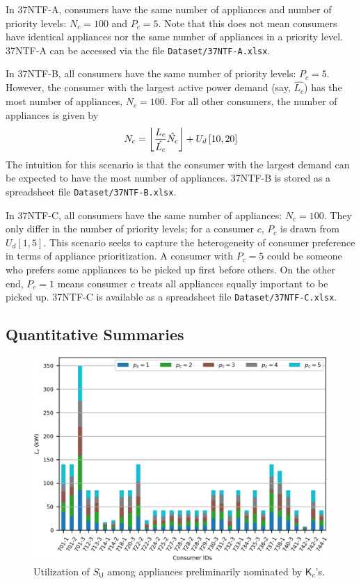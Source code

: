 \documentclass[journal, a4paper]{IEEEtran}
\DeclarePairedDelimiter\floor{\lfloor}{\rfloor}
\begin{document}
In 37NTF-A, consumers have the same number of appliances and number of priority levels:
$N_{c} = 100$ and $P_{c} = 5$.
Note that this does not mean consumers have identical appliances nor the same number of appliances in a priority level.
37NTF-A can be accessed via the file \texttt{Dataset/37NTF-A.xlsx}.

In 37NTF-B, all consumers have the same number of priority levels: $P_{c} = 5$.
However, the consumer with the largest active power demand (say, $\hat{L_{c}}$)
has the most number of appliances, $\hat{N_{c}} = 100$.
For all other consumers, the number of appliances is given by
\begin{equation*}
	N_{c} = \floor*{\frac{L_{c}}{\hat{L_{c}}} \hat{N_{c}}} + U_{d} \left[10,20\right]
\end{equation*}
The intuition for this scenario is that the consumer with the largest demand can be expected to have the most number of appliances.
37NTF-B is stored as a spreadsheet file \texttt{Dataset/37NTF-B.xlsx}.

In 37NTF-C, all consumers have the same number of appliances: $N_{c} = 100$.
They only differ in the number of priority levels;
for a consumer $c$, $P_{c}$ is drawn from $U_{d} \left[1,5\right]$.
This scenario seeks to capture the heterogeneity of consumer preference in terms of appliance prioritization.
A consumer with $P_{c} = 5$ could be someone who prefers some appliances to be picked up first before others.
On the other end, $P_{c} = 1$ means consumer $c$ treats all appliances equally important to be picked up.
37NTF-C is available as a spreadsheet file \texttt{Dataset/37NTF-C.xlsx}.


\subsection{Quantitative Summaries}
\label{subsec: III. Quantitative Summaries}

\begin{figure}[t!]
	\centering
	\includegraphics[scale=1.0]{37NTF-A TRPL}
	\caption{Utilization of $S_{\mathsf{U}}$ among appliances preliminarily nominated by $\mathsf{K}_{c}$'s.}
\end{figure}
\end{document}
